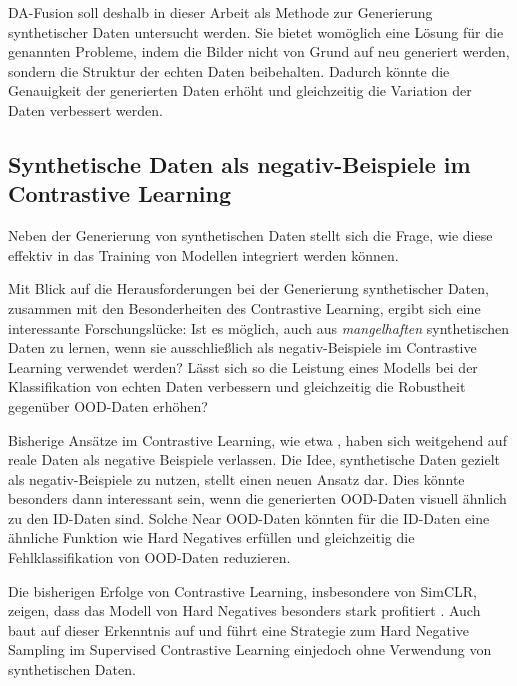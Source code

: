 DA-Fusion soll deshalb in dieser Arbeit als Methode zur Generierung synthetischer Daten untersucht werden. Sie bietet womöglich eine Lösung für die genannten Probleme, indem die Bilder nicht von Grund auf neu generiert werden, sondern die Struktur der echten Daten beibehalten. Dadurch könnte die Genauigkeit der generierten Daten erhöht und gleichzeitig die Variation der Daten verbessert werden.

\subsection{Synthetische Daten als negativ-Beispiele im Contrastive Learning} \label{subsec:synt-ood-contrastive}

Neben der Generierung von synthetischen Daten stellt sich die Frage, wie diese effektiv in das Training von Modellen integriert werden können.

Mit Blick auf die Herausforderungen bei der Generierung synthetischer Daten, zusammen mit den Besonderheiten des Contrastive Learning, ergibt sich eine interessante Forschungslücke: Ist es möglich, auch aus \emph{mangelhaften} synthetischen Daten zu lernen, wenn sie ausschließlich als negativ-Beispiele im Contrastive Learning verwendet werden? Lässt sich so die Leistung eines Modells bei der Klassifikation von echten Daten verbessern und gleichzeitig die Robustheit gegenüber OOD-Daten erhöhen?

Bisherige Ansätze im Contrastive Learning, wie etwa \parencite{Khosla2021supcon}, haben sich weitgehend auf reale Daten als negative Beispiele verlassen. Die Idee, synthetische Daten gezielt als negativ-Beispiele zu nutzen, stellt einen neuen Ansatz dar. Dies könnte besonders dann interessant sein, wenn die generierten OOD-Daten visuell ähnlich zu den ID-Daten sind. Solche Near OOD-Daten könnten für die ID-Daten eine ähnliche Funktion wie Hard Negatives erfüllen und gleichzeitig die Fehlklassifikation von OOD-Daten reduzieren.

Die bisherigen Erfolge von Contrastive Learning, insbesondere von SimCLR, zeigen, dass das Modell von Hard Negatives besonders stark profitiert \parencite{Chen2020simclr}. Auch \parencite{Jiang2024supconhardnegatives} baut auf dieser Erkenntnis auf und führt eine Strategie zum Hard Negative Sampling im Supervised Contrastive Learning ein\textemdash jedoch ohne Verwendung von synthetischen Daten.

